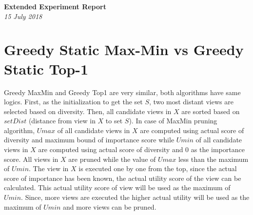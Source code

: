 \documentclass{article}
\begin{document}
\begin{titlepage}
	\begin{center}
		\Large\textbf{Extended Experiment Report}\\
		\large\textit{15 July 2018}
	\end{center}
\end{titlepage}

\section{Greedy Static Max-Min vs Greedy Static Top-1}

Greedy MaxMin and Greedy Top1 are very similar, both algorithms have same logics. First, as the initialization to get the set $ S $, two most distant views are selected based on diversity. Then, all candidate views in $ X $ are sorted based on $ setDist $ (distance from view in $ X $ to set $ S $). 
In case of MaxMin pruning algorithm, $ Umax $ of all candidate views in $ X $ are computed using actual score of diversity and maximum bound of importance score while $ Umin $ of all candidate views in $ X $ are computed using actual score of diversity and $ 0 $ as the importance score. All views in $ X $ are pruned while the value of $ Umax $ less than the maximum of $ Umin $. The view in $ X $ is executed one by one from the top, since the actual score of importance has been known, the actual utility score of the view can be calculated. This actual utility score of view will be used as the maximum of $ Umin $. Since, more views are executed the higher actual utility will be used as the maximum of $ Umin $ and more views can be pruned. 
\end{document}
